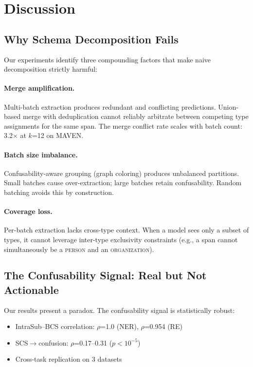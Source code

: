 \documentclass[11pt,a4paper]{article}
\begin{document}
\section{Discussion}

\subsection{Why Schema Decomposition Fails}

Our experiments identify three compounding factors that make naive decomposition strictly harmful:

\paragraph{Merge amplification.} Multi-batch extraction produces redundant and conflicting predictions. Union-based merge with deduplication cannot reliably arbitrate between competing type assignments for the same span. The merge conflict rate scales with batch count: 3.2$\times$ at $k$=12 on MAVEN.

\paragraph{Batch size imbalance.} Confusability-aware grouping (graph coloring) produces unbalanced partitions. Small batches cause over-extraction; large batches retain confusability. Random batching avoids this by construction.

\paragraph{Coverage loss.} Per-batch extraction lacks cross-type context. When a model sees only a subset of types, it cannot leverage inter-type exclusivity constraints (e.g., a span cannot simultaneously be a \textsc{person} and an \textsc{organization}).

\subsection{The Confusability Signal: Real but Not Actionable}

Our results present a paradox. The confusability signal is statistically robust:
\begin{itemize}
\item IntraSub--BCS correlation: $\rho$=1.0 (NER), $\rho$=0.954 (RE)
\item SCS$\rightarrow$confusion: $\rho$=0.17--0.31 ($p<10^{-5}$)
\item Cross-task replication on 3 datasets
\end{itemize}
\end{document}
